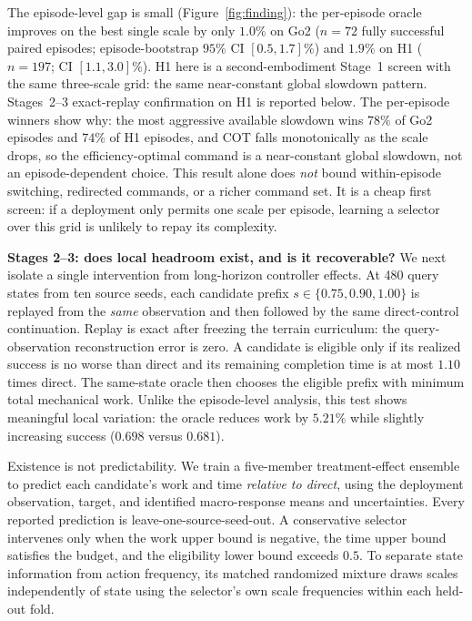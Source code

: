 \documentclass{article}
\begin{document}
The episode-level gap is small (Figure~\ref{fig:finding}): the per-episode oracle
improves on the best single scale by only $1.0\%$ on Go2 ($n=72$ fully successful
paired episodes; episode-bootstrap $95\%$ CI $[0.5, 1.7]\%$) and $1.9\%$ on H1
($n=197$; CI $[1.1, 3.0]\%$). H1 here is a second-embodiment Stage~1 screen with
the same three-scale grid: the same near-constant global slowdown pattern.
Stages~2--3 exact-replay confirmation on H1 is reported below. The per-episode
winners show why: the most aggressive available slowdown wins $78\%$ of Go2
episodes and $74\%$ of H1 episodes, and COT falls monotonically as the scale
drops, so the efficiency-optimal command is a near-constant global slowdown, not
an episode-dependent choice. This result alone does \emph{not} bound
within-episode switching, redirected commands, or a richer command set. It is a
cheap first screen: if a deployment only permits one scale per episode, learning
a selector over this grid is unlikely to repay its complexity.

\textbf{Stages 2--3: does local headroom exist, and is it recoverable?}
We next isolate a single intervention from long-horizon controller effects.
At 480 query states from ten source seeds, each candidate prefix
$s\in\{0.75,0.90,1.00\}$ is replayed from the \emph{same} observation and then
followed by the same direct-control continuation. Replay is exact after freezing
the terrain curriculum: the query-observation reconstruction error is zero.
A candidate is eligible only if its realized success is no worse than direct
and its remaining completion time is at most $1.10$ times direct. The
same-state oracle then chooses the eligible prefix with minimum total mechanical
work. Unlike the episode-level analysis, this test shows meaningful local
variation: the oracle reduces work by $5.21\%$ while slightly increasing
success ($0.698$ versus $0.681$).

Existence is not predictability. We train a five-member treatment-effect ensemble
to predict each candidate's work and time \emph{relative to direct}, using the
deployment observation, target, and identified macro-response means and
uncertainties. Every reported prediction is leave-one-source-seed-out. A
conservative selector intervenes only when the work upper bound is negative,
the time upper bound satisfies the budget, and the eligibility lower bound
exceeds $0.5$. To separate state information from action frequency, its matched
randomized mixture draws scales independently of state using the selector's
own scale frequencies within each held-out fold.
\end{document}
